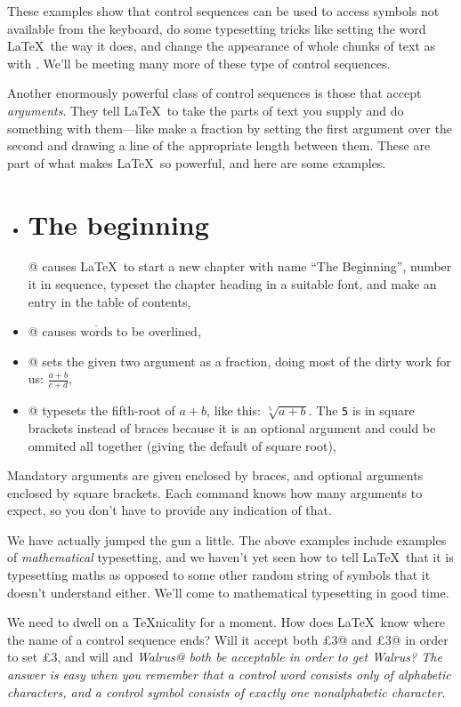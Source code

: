 These examples show that control sequences can be used to
access symbols not available from the keyboard,
do some typesetting tricks like setting the word
\LaTeX\ the way it does, and change the appearance of
whole chunks of text as with \verb@\em@.  We'll be meeting
many more of these type of control sequences.

Another enormously powerful class of control sequences is
those that accept {\em arguments}.  They tell \LaTeX\
to take the parts of text you supply and do something
with them---like make a fraction by setting the first
argument over the second and drawing a line of the
appropriate length between them.  These are part of
what makes \LaTeX\ so powerful, and here are some
examples.

\begin{itemize}
\item \verb@\chapter{The beginning}@ causes \LaTeX\ to
	      start a new chapter with name ``The Beginning'', number
	      it in sequence, typeset the chapter heading in a suitable
	      font, and make an entry in the table of contents,
\item \verb@{}@ causes $\overline{\mbox{words}}$ to
	      be overlined,
\item \verb@{}@ sets the given two argument as
	       a fraction, doing most of the dirty work for us: $\frac{a+b}{c+d}$,
\item \verb@\sqrt[5]{a+b}@ typesets the fifth-root of $a+b$,
	       like this: $\sqrt[5]{a+b}$. The {\tt 5} is in square brackets
	       instead of braces because it is an optional argument and
		could be ommited all together (giving the default of square root),
\end{itemize}

Mandatory arguments are given enclosed by braces, and
optional arguments enclosed by square brackets.  Each
command knows how many arguments to expect, so
you don't have to provide any indication of that.

We have actually jumped the gun a little.  The above examples
include examples of {\em mathematical\/} typesetting, and we
haven't yet seen how to tell \LaTeX\ that it is typesetting
maths as opposed to some other random string of symbols
that it doesn't understand either.  We'll come to mathematical
typesetting in good time.

We need to dwell on a {\TeX}nicality for a moment.  How does
\LaTeX\ know where the name of a control sequence ends?
Will it accept both \verb@\pounds3@ and \verb@\pounds 3@
in order to set \pounds3, and will \verb@\emWalrus@
and \verb@\em Walrus@ both be acceptable in order to
get {\em Walrus\/}?  The answer is easy when you remember
that a control word consists only of alphabetic characters,
and a control symbol consists of exactly one nonalphabetic
character.

